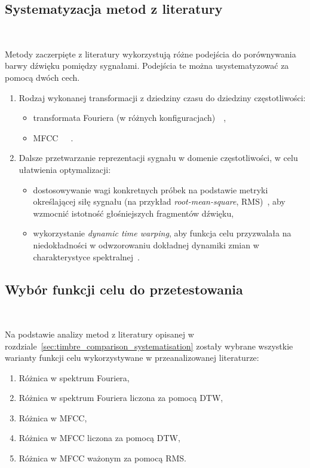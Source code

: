 \subsection{Systematyzacja metod z literatury}~\label{sec:timbre_comparison_systematisation}

Metody zaczerpięte z literatury wykorzystują różne podejścia do porównywania barwy dźwięku
pomiędzy sygnałami. Podejścia te można usystematyzować za pomocą dwóch cech.

\begin{enumerate}
  \item Rodzaj wykonanej transformacji z dziedziny czasu do dziedziny częstotliwości:
  \begin{itemize}
    \item transformata Fouriera (w różnych konfiguracjach)~\cite{riffusion}~\cite{ddx7},
    \item MFCC~\cite{ieee_synth_programming}~\cite{evolutionary_puredata}~\cite{mfcc_dtw}.
  \end{itemize}
  \item Dalsze przetwarzanie reprezentacji sygnału w domenie częstotliwości, w celu ułatwienia optymalizacji:
    \begin{itemize}
      \item dostosowywanie wagi konkretnych próbek na podstawie metryki określającej siłę sygnału
        (na przykład \textit{root-mean-square}, RMS)~\cite{parallel_evolutionary_optimization_synth_parameters},
        aby wzmocnić istotność głośniejszych fragmentów dźwięku,
      \item wykorzystanie \textit{dynamic time warping}, aby funkcja celu przyzwalała na
        niedokładności w odwzorowaniu dokładnej dynamiki zmian w charakterystyce spektralnej~\cite{mfcc_dtw}.
    \end{itemize}
\end{enumerate}

\subsection{Wybór funkcji celu do przetestowania}~\label{sec:considered_target_functions}

Na podstawie analizy metod z literatury opisanej w rozdziale~\ref{sec:timbre_comparison_systematisation} zostały wybrane wszystkie warianty
funkcji celu wykorzystywane w przeanalizowanej literaturze:

\begin{enumerate}
  \item Różnica w spektrum Fouriera,
  \item Różnica w spektrum Fouriera liczona za pomocą DTW,
  \item Różnica w MFCC,
  \item Różnica w MFCC liczona za pomocą DTW\@,
  \item Różnica w MFCC ważonym za pomocą RMS\@.
\end{enumerate}

